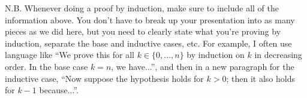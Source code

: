 \documentclass[11pt]{article}
\begin{document}
\begin{qunlist}
  N.B. Whenever doing a proof by induction, make sure to include all of the information above. You don't have to break up your presentation into as many pieces as we did here, but you need to clearly state what you're proving by induction, separate the base and inductive cases, etc. For example, I often use language like ``We prove this for all $k \in \{0, \dots, n\}$ by induction on $k$ in decreasing order. In the base case $k = n$, we have...'', and then in a new paragraph for the inductive case, ``Now suppose the hypothesis holds for $k > 0$; then it also holds for $k-1$ because...''.

\end{qunlist}
\end{document}
